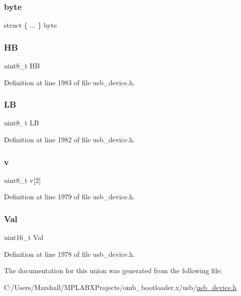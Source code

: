 \subsubsection{\texorpdfstring{byte}{byte}}
{\footnotesize\ttfamily struct \{ ... \}   byte}

\mbox{\label{unionuint16__t___v_a_l_ad741fe9900e35379cedd1deefa7ba84f}} 
\subsubsection{\texorpdfstring{HB}{HB}}
{\footnotesize\ttfamily uint8\+\_\+t HB}



Definition at line 1983 of file usb\+\_\+device.\+h.

\mbox{\label{unionuint16__t___v_a_l_aecc66fcbbc95a34cfd23bddac11a425d}} 
\subsubsection{\texorpdfstring{LB}{LB}}
{\footnotesize\ttfamily uint8\+\_\+t LB}



Definition at line 1982 of file usb\+\_\+device.\+h.

\mbox{\label{unionuint16__t___v_a_l_a81a08957904c562944b33d7d2ae4f42d}} 
\subsubsection{\texorpdfstring{v}{v}}
{\footnotesize\ttfamily uint8\+\_\+t v\mbox{[}2\mbox{]}}



Definition at line 1979 of file usb\+\_\+device.\+h.

\mbox{\label{unionuint16__t___v_a_l_ac5c61e3f936b9c3554b06beb5961c12e}} 
\subsubsection{\texorpdfstring{Val}{Val}}
{\footnotesize\ttfamily uint16\+\_\+t Val}



Definition at line 1978 of file usb\+\_\+device.\+h.



The documentation for this union was generated from the following file\+:\begin{DoxyCompactItemize}
\item 
C\+:/\+Users/\+Marshall/\+M\+P\+L\+A\+B\+X\+Projects/omb\+\_\+bootloader.\+x/usb/\mbox{\hyperlink{usb__device_8h}{usb\+\_\+device.\+h}}\end{DoxyCompactItemize}
